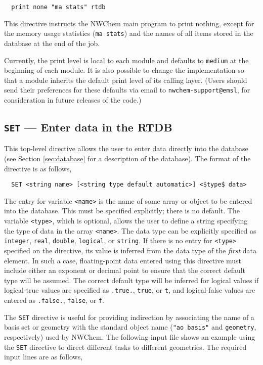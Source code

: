\begin{verbatim}
  print none "ma stats" rtdb
\end{verbatim}

This directive instructs the NWChem main program to print nothing,
except for the memory usage statistics (\verb+ma stats+) and
the names of all items stored in the database at the end of the job.

Currently, the print level is local to each module and defaults to
{\tt medium} at the beginning of each module.  It is also possible to change
the implementation so that a module inherits the default print level
of its calling layer.  (Users should send their preferences for these
defaults via email to \verb+nwchem-support@emsl+, for consideration in
future releases of the code.)

\subsection{{\tt SET} --- Enter data in the RTDB}
\label{sec:set}

This top-level directive allows the user to enter data directly into the
database (see Section \ref{sec:database} for a description of the database).
The format of the directive is as follows,

\begin{verbatim}
  SET <string name> [<string type default automatic>] <$type$ data>
\end{verbatim}

The entry for variable \verb+<name>+ is the name of some array or object to be entered
into the database.  This must be specified explicitly; there is no
default.  The variable \verb+<type>+, which is optional, allows the user to define a string
specifying the type of data in the array \verb+<name>+.  The data type
can be explicitly specified as \verb+integer+, \verb+real+,
\verb+double+, \verb+logical+, or \verb+string+.  If there is no entry
for \verb+<type>+ specified on
the directive, its value is inferred from
the data type of the {\em first} data element.  In such a case,
floating-point data entered using this directive must include either
an exponent or decimal point to ensure that the correct default type
will be assumed.  The correct default type will be inferred for
logical values if logical-true values are specified as \verb+.true.+,
\verb+true+, or \verb+t+, and logical-false values are entered as
\verb+.false.+, \verb+false+, or \verb+f+.

The \verb+SET+ directive is useful for providing indirection by 
associating the name of a basis set or geometry with the standard object
name (\verb+"ao basis"+ and \verb+geometry+, respectively) used
by NWChem.  The following input file shows an example using 
the \verb+SET+ directive to direct different tasks to different geometries.
The required input lines are as follows,

